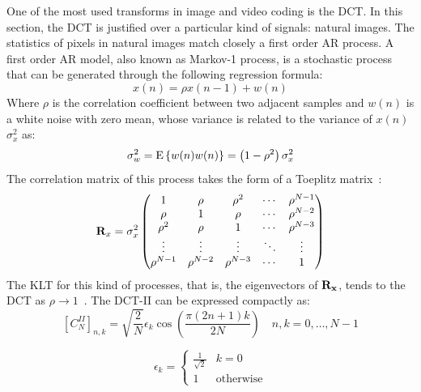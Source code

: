 \documentclass[11pt,a4paper,openright,twoside]{book}
\numberwithin{equation}{section} %
\numberwithin{figure}{section} %
\numberwithin{table}{section} %
\begin{document}
One of the most used transforms in image and video coding is the
\acf{DCT}.
In this section, the \ac{DCT} is justified over a particular kind
of signals: natural images.
The statistics of pixels in natural images match closely a first order
\ac{AR} process.
A first order \ac{AR} model, also known as Markov-1 process, is a stochastic
process that can be generated through the following regression formula:
\begin{equation}
	x(n) = \rho x(n-1) + w(n)
	\label{eqn:first_order_ar_model}
\end{equation}
Where $\rho$ is the correlation coefficient between two adjacent samples
and $w(n)$ is a white noise with zero mean, whose variance is related to
the variance of $x(n)$ $\sigma_x^2$ as:
\begin{equation}
	\sigma_w^2 = \text{E}\left\{ w(n) w(n) \right\} =
	\left(1-\rho^2\right)\sigma_x^2
\end{equation}
The correlation matrix of this process takes the form of a Toeplitz
matrix~\cite{akansu-12-toeplitz-approximation}:
\begin{equation}
	\mathbf{R}_x = \sigma_x^2
	\begin{pmatrix}
		1          & \rho       & \rho^2     & \cdots & \rho^{N-1} \\
		\rho       & 1          & \rho       & \cdots & \rho^{N-2} \\
		\rho^2     & \rho       & 1          & \cdots & \rho^{N-3} \\
		\vdots     & \vdots     & \vdots     & \ddots & \vdots     \\
		\rho^{N-1} & \rho^{N-2} & \rho^{N-3} & \cdots & 1
	\end{pmatrix}
	\label{eqn:toeplitz_matrix}
\end{equation}
The \ac{KLT} for this kind of processes, that is, the eigenvectors of
$\mathbf{R}_{\mathbf{x}}$, tends to the \ac{DCT} as $\rho\to1$~\cite{britanak-06-dct-and-dst}.
The \ac{DCT}-II can be expressed compactly as:
\begin{equation}
	{\left[C_{N}^{II} \right]}_{n,k} =
	\sqrt{\frac{2}{N}}\epsilon_k\cos\left(\frac{\pi(2n+1)k}{2N}\right)
	\quad
	n,k=0,\dots,N-1
	\label{eqn:dct_ii}
\end{equation}

\begin{equation}
	\epsilon_k =
	\begin{cases}
		\frac{1}{\sqrt{2}} & k = 0 \\
		1 & \text{otherwise}
	\end{cases}
\end{equation}
\end{document}
